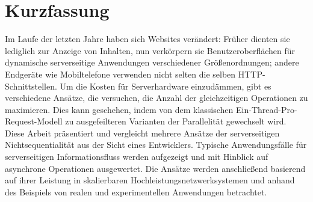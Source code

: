 \chapter{Kurzfassung}
Im Laufe der letzten Jahre haben sich Websites ver{\"a}ndert: Fr{\"u}her dienten sie lediglich zur Anzeige von Inhalten, nun verk{\"o}rpern sie Benutzeroberfl{\"a}chen f{\"u}r dynamische serverseitige Anwendungen verschiedener Gr{\"o}{\ss}enordnungen; andere Endger{\"a}te wie Mobiltelefone verwenden nicht selten die selben HTTP-Schnittstellen. Um die Kosten f{\"u}r Serverhardware einzud{\"a}mmen, gibt es verschiedene Ans{\"a}tze, die versuchen, die Anzahl der gleichzeitigen Operationen zu maximieren. Dies kann geschehen, indem von dem klassischen Ein-Thread-Pro-Request-Modell zu ausgefeilteren Varianten der Parallelit{\"a}t gewechselt wird. Diese Arbeit pr{\"a}sentiert und vergleicht mehrere Ans{\"a}tze der serverseitigen Nichtsequentialit{\"a}t aus der Sicht eines Entwicklers. Typische Anwendungsf{\"a}lle f{\"u}r serverseitigen Informationsfluss werden aufgezeigt und mit Hinblick auf asynchrone Operationen ausgewertet. Die Ans{\"a}tze werden anschlie{\ss}end basierend auf ihrer Leistung in skalierbaren Hochleistungsnetzwerksystemen und anhand des Beispiels von realen und experimentellen Anwendungen betrachtet.